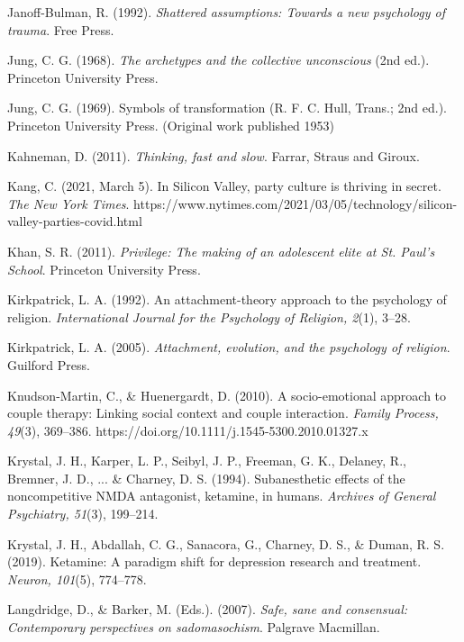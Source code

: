 \begin{thebibliography}{}
    Janoff-Bulman, R. (1992). \textit{Shattered assumptions: Towards a new psychology of trauma}. Free Press.

    Jung, C. G. (1968). \textit{The archetypes and the collective unconscious} (2nd ed.). Princeton University Press.

    Jung, C. G. (1969). Symbols of transformation (R. F. C. Hull, Trans.; 2nd ed.). Princeton University Press. (Original work published 1953)
    
    Kahneman, D. (2011). \textit{Thinking, fast and slow}. Farrar, Straus and Giroux.

    Kang, C. (2021, March 5). In Silicon Valley, party culture is thriving in secret. \textit{The New York Times}. https://www.nytimes.com/2021/03/05/technology/silicon-valley-parties-covid.html

    Khan, S. R. (2011). \textit{Privilege: The making of an adolescent elite at St. Paul's School}. Princeton University Press.

    Kirkpatrick, L. A. (1992). An attachment-theory approach to the psychology of religion. \textit{International Journal for the Psychology of Religion, 2}(1), 3–28.

    Kirkpatrick, L. A. (2005). \textit{Attachment, evolution, and the psychology of religion}. Guilford Press.

    Knudson-Martin, C., \& Huenergardt, D. (2010). A socio-emotional approach to couple therapy: Linking social context and couple interaction. \textit{Family Process, 49}(3), 369–386. https://doi.org/10.1111/j.1545-5300.2010.01327.x

    Krystal, J. H., Karper, L. P., Seibyl, J. P., Freeman, G. K., Delaney, R., Bremner, J. D., ... \& Charney, D. S. (1994). Subanesthetic effects of the noncompetitive NMDA antagonist, ketamine, in humans. \textit{Archives of General Psychiatry, 51}(3), 199–214.

    Krystal, J. H., Abdallah, C. G., Sanacora, G., Charney, D. S., \& Duman, R. S. (2019). Ketamine: A paradigm shift for depression research and treatment. \textit{Neuron, 101}(5), 774–778.

    Langdridge, D., \& Barker, M. (Eds.). (2007). \textit{Safe, sane and consensual: Contemporary perspectives on sadomasochism}. Palgrave Macmillan.


\end{thebibliography}
